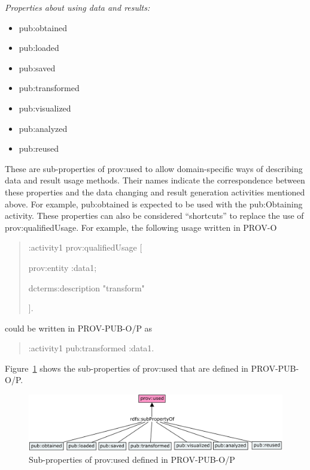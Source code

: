 {\noindent\emph{Properties about using data and results:}}
\begin{itemize}
	\item pub:obtained
	\item pub:loaded
	\item pub:saved
	\item pub:transformed%
	\item pub:visualized
	\item pub:analyzed
	\item pub:reused
\end{itemize}
These are sub-properties of prov:used to allow domain-specific ways of describing data and result usage methods. Their names indicate the correspondence between these properties and the data changing and result generation activities mentioned above. For example, pub:obtained is expected to be used with the pub:Obtaining activity. These properties can also be considered ``shortcuts'' to replace the use of prov:qualifiedUsage. For example, the following usage written in PROV-O
\begin{quotation}
	:activity1 prov:qualifiedUsage [
	
	\hspace{2em}prov:entity :data1;
	
	\hspace{2em}dcterms:description "transform"
	
	].
\end{quotation}
could be written in PROV-PUB-O/P as
\begin{quotation}
	:activity1 pub:transformed :data1.
\end{quotation}
Figure~\ref{fig:prov-pub-p-usage} shows the sub-properties of prov:used that are defined in PROV-PUB-O/P.
\begin{figure}
	\includegraphics[width=\textwidth]{model/ontology/prov-pub/prov-pub-p-usage.png}
	\caption{Sub-properties of prov:used defined in PROV-PUB-O/P}
	\label{fig:prov-pub-p-usage}
\end{figure}

